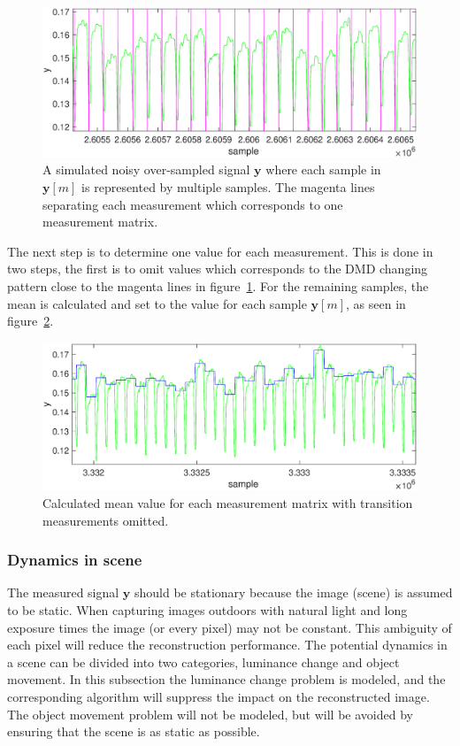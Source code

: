 \begin{figure}[H]
\includegraphics[width = 1\linewidth]{gfx/signal_proc/isolated_raw_signal.eps}
\caption{A simulated noisy over-sampled signal $\mathbf{y}$ where each sample in $\mathbf{y}[m]$ is represented by multiple samples. The magenta lines separating each measurement which corresponds to one measurement matrix.}
	\label{fig:raw_signal}
\end{figure}

The next step is to determine one value for each measurement. This is done in two steps, the first is to omit values which corresponds to the DMD changing pattern close to the magenta lines in figure~\ref{fig:raw_signal}. For the remaining samples, the mean is calculated and set to the value for each sample $\mathbf{y}[m]$, as seen in figure~\ref{fig:detarmain_signal}. 

\begin{figure}[H]
\includegraphics[width = 1\linewidth]{gfx/signal_proc/isolated_final_signal.eps}
\caption{Calculated mean value for each measurement matrix with transition measurements omitted.}
	\label{fig:detarmain_signal}
\end{figure}



\subsubsection{Dynamics in scene} %
\label{sec:Dynamics_in_scene}
The measured signal $\mathbf{y}$ should be stationary because the image (scene) is assumed to be static. When capturing images outdoors with natural light and long exposure times the image (or every pixel) may not be constant. This ambiguity of each pixel will reduce the reconstruction performance. The potential dynamics in a scene can be divided into two categories, luminance change and object movement. In this subsection the luminance change problem is modeled, and the corresponding algorithm will suppress the impact on the reconstructed image. The object movement problem will not be modeled, but will be avoided by ensuring that the scene is as static as possible.\\[0.1in] 


